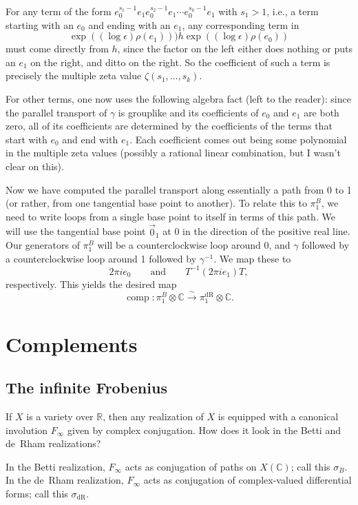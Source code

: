 \documentclass[12pt]{article}
\def\CC{\mathbb{C}}
\def\RR{\mathbb{R}}
\DeclareMathOperator{\comp}{comp}
\DeclareMathOperator{\dR}{dR}
\begin{document}
For any term of the form
$e_0^{s_1-1} e_1 e_0^{s_2-1}e_1\cdots e_0^{s_k-1}e_1$
with $s_1 > 1$, i.e., a term starting with an $e_0$ and ending with an $e_1$,
any corresponding term in
\[
\exp((\log \epsilon) \rho(e_1))) h \exp((\log \epsilon) \rho(e_0))
\]
must come directly from $h$, since the factor on the left either does nothing
or puts an $e_1$ on the right, and ditto on the right. So the coefficient
of such a term is precisely the multiple zeta value $\zeta(s_1, \dots, s_k)$.

For other terms, one now uses the following algebra fact (left to
the reader): since the parallel transport of $\gamma$
is grouplike and its coefficients of $e_0$ and $e_1$ are both zero, all of
its coefficients are determined by the coefficients of the terms that
start with $e_0$ and end with $e_1$. Each coefficient comes out being
some polynomial in the multiple zeta values (possibly a rational linear
combination, but I wasn't clear on this).

Now we have computed the parallel transport along essentially a path from 0
to 1 (or rather, from one tangential base point to another). To relate this
to $\pi_1^B$, we need to write loops from a single base point to itself in
terms of this path. We will use the tangential base point $\vec{0}_1$
at 0 in the direction of the positive real line. Our generators of 
$\pi_1^B$ will be a counterclockwise loop around 0, and $\gamma$ followed
by a counterclockwise loop around 1 followed by $\gamma^{-1}$. We map these to
\[
2 \pi i e_0 \qquad \mbox{and} \qquad T^{-1} (2 \pi i e_1) T,
\]
respectively. This yields the desired map
\[
\comp: \pi_1^B \otimes \CC \stackrel{\sim}{\to} \pi_1^{\dR} \otimes \CC.
\]

\section{Complements}

\subsection{The infinite Frobenius}

If $X$ is a variety over $\RR$, then any realization of $X$
is equipped with a canonical involution $F_{\infty}$
given by complex conjugation. How
does it look in the Betti and de~Rham realizations?

In the Betti realization, $F_\infty$ acts as conjugation of paths
on $X(\CC)$; call this $\sigma_B$. In the de~Rham realization,
$F_\infty$ acts as conjugation of complex-valued differential forms;
call this $\sigma_{\dR}$.
\end{document}
